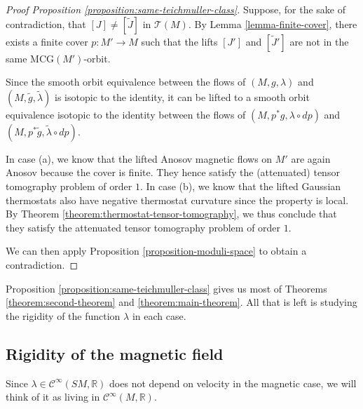 \documentclass[reqno,12pt,letterpaper]{amsart}
\theoremstyle{definition}
\theoremstyle{remark}
\theoremstyle{definition}
\numberwithin{equation}{section}
\newcommand{\R}{\mathbb{R}}
\begin{document}
\begin{proof}[Proof Proposition \ref{proposition:same-teichmuller-class}] Suppose, for the sake of contradiction, that $[J]\neq [\widetilde{J}]$ in $\mathcal{T}(M)$. By Lemma \ref{lemma-finite-cover}, there exists a finite cover $p:M'\to M$ such that the lifts $[J']$ and $[\widetilde{J}']$ are not in the same $\text{MCG}(M')$-orbit. 

Since the smooth orbit equivalence between the flows of $(M, g, \lambda)$ and $(M, \tilde{g}, \tilde{\lambda})$ is isotopic to the identity, it can be lifted to a smooth orbit equivalence isotopic to the identity between the flows of $(M, p^*g, \lambda\circ dp)$ and $(M, p^*\tilde{g}, \tilde{\lambda}\circ dp)$. %

In case (a), we know that the lifted Anosov magnetic flows on $M'$ are again Anosov because the cover is finite. They hence satisfy the (attenuated) tensor tomography problem of order $1$. In case (b), we know that the lifted Gaussian thermostats also have negative thermostat curvature since the property is local. By Theorem \ref{theorem:thermostat-tensor-tomography}, we thus conclude that they satisfy the attenuated tensor tomography problem of order $1$. 

We can then apply Proposition \ref{proposition-moduli-space} to obtain a contradiction.
\end{proof}

Proposition \ref{proposition:same-teichmuller-class} gives us most of Theorems \ref{theorem:second-theorem} and \ref{theorem:main-theorem}. All that is left is studying the rigidity of the function $\lambda$ in each case. 

\subsection{Rigidity of the magnetic field}  
Since $\lambda\in \mathcal{C}^\infty(SM,\R)$ does not depend on velocity in the magnetic case, we will think of it as living in $\mathcal{C}^\infty(M,\R)$. 
\end{document}
